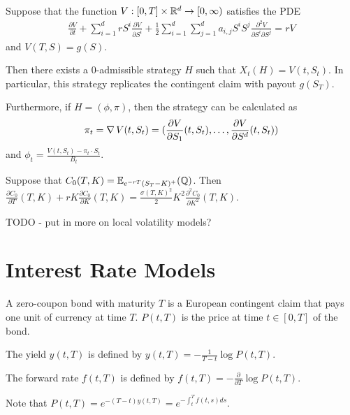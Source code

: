 \begin{thm}
  \label{sec:hedg-cont-claims-3}
  Suppose that the function $V: [0, T] \times \mathbb{R}^{d} \rightarrow [0,
  \infty)$ satisfies the PDE
  \begin{align}
    \label{eq:26}
    \frac{\partial V}{\partial t} + \sum_{i=1}^{d} r S^{i}
    \frac{\partial V}{\partial S^{i}} + \frac{1}{2} \sum_{i=1}^{d}
    \sum_{j=1}^{d} a_{i, j} S^{i} S^{j} \frac{\partial^{2} V}{\partial
      S^{i} \partial S^{j}} = rV
  \end{align} and $V(T, S) = g(S)$.

  Then there exists a $0$-admissible strategy $H$ such that $X_{t}(H)
  = V(t, S_{t})$. In particular, this strategy replicates the
  contingent claim with payout $g(S_{T})$.

  Furthermore, if $H = (\phi, \pi)$, then the strategy can be
  calculated as
  \begin{align}
    \label{eq:27}
    \pi_{t} = \operatorname*{\nabla} V(t, S_{t}) = (\frac{\partial V}{\partial
      S_{1}}(t, S_{t}), \dots, \frac{\partial V}{\partial S^{d}}(t,
    S_{t}))
  \end{align} and $\phi_{t} = \frac{V(t, S_{t}) - \pi_{t} \cdot
    S_{t}}{B_{t}}$.
\end{thm}

\begin{thm}
  \label{sec:hedg-cont-claims-4}
  Suppose that $C_{0}(T, K) = \E{\Q}{e^{-rT}(S_{T} - K)^{+}}$.  Then
  $\frac{\partial C_{0}}{\partial T}(T, K) + rK \frac{\partial
    C_{0}}{\partial K}(T, K) = \frac{\sigma(T, K)^{2}}{2} K^{2}
  \frac{\partial^{2} C_{0}}{\partial K^{2}}(T, K)$.
\end{thm}

TODO - put in more on local volatility models?

\section{Interest Rate Models}
\label{sec:interest-rate-models}
\begin{defn}
  \label{sec:interest-rate-models-1}
  A zero-coupon bond with maturity $T$ is a European contingent claim
  that pays one unit of currency at time $T$.  $P(t, T)$ is the price
  at time $t \in [0, T]$ of the bond.

  The yield $y(t, T)$ is defined by $y(t, T) = - \frac{1}{T- t} \log
  P(t, T)$.

  The forward rate $f(t, T)$ is defined by $f(t, T) = -
  \frac{\partial}{\partial T} \log P(t, T)$.

  Note that $P(t, T) = e^{-(T-t) y(t, T)} = e^{-\int_{t}^{T} f(t, s)
    ds}$.
\end{defn}

